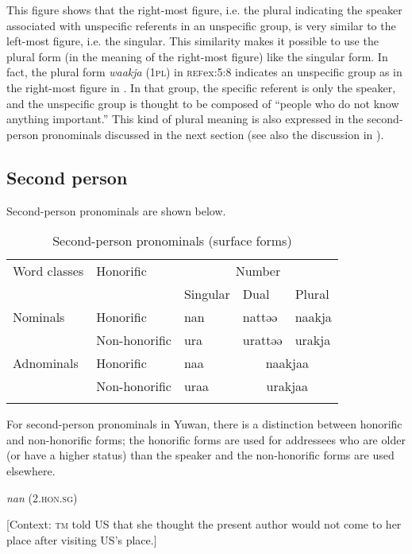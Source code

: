 This figure shows that the right-most figure, i.e. the plural indicating the speaker associated with unspecific referents in an unspecific group, is very similar to the left-most figure, i.e. the singular. This similarity makes it possible to use the plural form (in the meaning of the right-most figure) like the singular form. In fact, the plural form \textit{waakja} (1\textsc{pl}) in \textsc{ref}{ex:5:8} indicates an unspecific group as in the right-most figure in . In that group, the specific referent is only the speaker, and the unspecific group is thought to be composed of “people who do not know anything important.” This kind of plural meaning is also expressed in the second-person pronominals discussed in the next section (see also the discussion in ).

\subsection{Second person}

Second-person pronominals are shown below.

\begin{table}
\caption{\label{tab:key:34}Second-person pronominals (surface forms)}
\begin{tabular}{lllll}
\lsptoprule
Word classes  & Honorific & \multicolumn{3}{c}{Number}\\\cmidrule(lr){3-5}
              &           &    Singular & Dual & Plural\\\midrule
Nominals & Honorific & nan & nattəə & naakja\\
         & Non-honorific & ura & urattəə & urakja\\
Adnominals & Honorific & naa & \multicolumn{2}{c}{naakjaa}\\
           & Non-honorific & uraa & \multicolumn{2}{c}{urakjaa}\\
\lspbottomrule
\end{tabular}
\end{table}

For second-person pronominals in Yuwan, there is a distinction between honorific and non-honorific forms; the honorific forms are used for addressees who are older (or have a higher status) than the speaker and the non-honorific forms are used elsewhere.

\ea \label{ex:5:9}  \ea \label{ex:5:9a} \textit{nan} (2.\textsc{hon}.\textsc{sg})

    [Context: \textsc{tm} told US that she thought the present author would not come to her place after visiting US’s place.]

